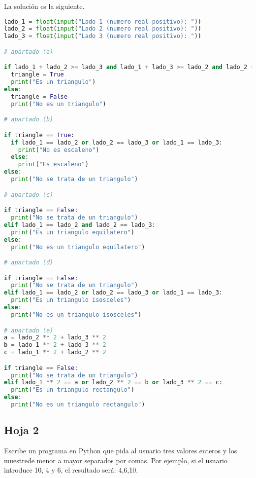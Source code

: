 \documentclass{article}
\begin{document}
\begin{sol}
La solución es la siguiente.
\begin{lstlisting}[language = Python]
lado_1 = float(input("Lado 1 (numero real positivo): "))
lado_2 = float(input("Lado 2 (numero real positivo): "))
lado_3 = float(input("Lado 3 (numero real positivo): "))

# apartado (a)

if lado_1 + lado_2 >= lado_3 and lado_1 + lado_3 >= lado_2 and lado_2 + lado_3 >= lado_1:
  triangle = True
  print("Es un triangulo")
else:
  triangle = False
  print("No es un triangulo")

# apartado (b)

if triangle == True:
  if lado_1 == lado_2 or lado_2 == lado_3 or lado_1 == lado_3:
    print("No es escaleno")
  else:
    print("Es escaleno")
else:
  print("No se trata de un triangulo")

# apartado (c)

if triangle == False:
  print("No se trata de un triangulo")
elif lado_1 == lado_2 and lado_2 == lado_3:
  print("Es un triangulo equilatero")
else: 
  print("No es un triangulo equilatero")

# apartado (d)

if triangle == False:
  print("No se trata de un triangulo")
elif lado_1 == lado_2 or lado_2 == lado_3 or lado_1 == lado_3:
  print("Es un triangulo isosceles")
else: 
  print("No es un triangulo isosceles")

# apartado (e)
a = lado_2 ** 2 + lado_3 ** 2
b = lado_1 ** 2 + lado_3 ** 2
c = lado_1 ** 2 + lado_2 ** 2

if triangle == False:
  print("No se trata de un triangulo")
elif lado_1 ** 2 == a or lado_2 ** 2 == b or lado_3 ** 2 == c:
  print("Es un triangulo rectangulo")
else: 
  print("No es un triangulo rectangulo")
\end{lstlisting}
\end{sol}

\subsection{Hoja 2}

\begin{ej}
Escribe un programa en Python que pida al usuario tres valores enteros y los muestrede menor a mayor separados por comas. Por ejemplo, si el usuario introduce 10, 4 y 6, el resultado será: 4,6,10.
\end{ej}
\end{document}

